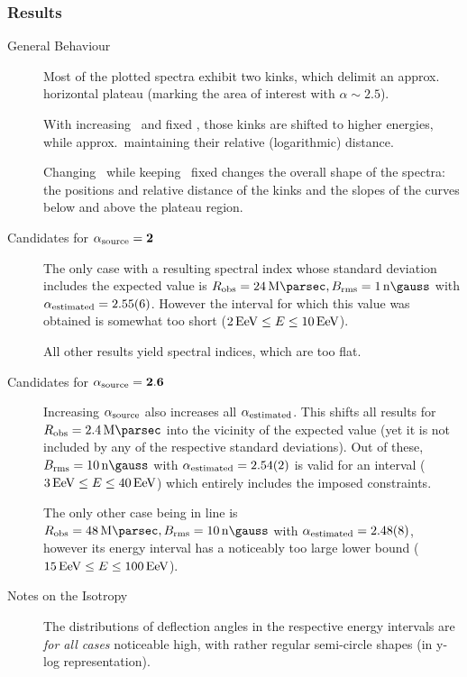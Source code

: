 \subsubsection*{Results}
\begin{description}
    \item[General Behaviour]
        Most of the plotted spectra exhibit two kinks, which delimit an
        approx.~ horizontal plateau (marking the area of interest with
        $\alpha\sim2.5$).

        With increasing \Robserver~and fixed \Brms, those kinks are shifted to
        higher energies, while approx.~maintaining their relative (logarithmic)
        distance.

        Changing \Brms~while keeping \Robserver~fixed changes the overall shape
        of the spectra: the positions and relative distance of the kinks and
        the slopes of the curves below and above the plateau region.

    \item[Candidates for $\mathbf{\alphasource=2}$]
        The only case with a resulting spectral index whose standard deviation
        includes the expected value is $\Robserver=\SI{24}{\mega\parsec},
        \Brms=\SI{1}{\nano\gauss}$ with $\alphafalling=\num{2.55(6)}$. However
        the interval for which this value was obtained is somewhat too short
        ($\inrange{E}{2}{10}{\exa\eV}$).

        All other results yield spectral indices, which are too flat.

    \item[Candidates for $\mathbf{\alphasource=2.6}$]
        Increasing ${\alphasource}$ also increases all
        ${\alphafalling}$. This shifts all results for
        $\Robserver=\SI{2.4}{\mega\parsec}$ into the vicinity of the expected
        value (yet it is not included by any of the respective standard
        deviations). Out of these, $\Brms=\SI{10}{\nano\gauss}$ with
        $\alphafalling=\num{2.54(2)}$ is valid for an interval
        ($\inrange{E}{3}{40}{\exa\eV}$) which entirely includes the imposed
        constraints.

        The only other case being in line is $\Robserver=\SI{48}{\mega\parsec},
        \Brms=\SI{10}{\nano\gauss}$ with $\alphafalling=\num{2.48(8)}$,
        however its energy interval has a noticeably too large lower bound
        ($\inrange{E}{15}{100}{\exa\eV}$).

    \item[Notes on the Isotropy]
        The distributions of deflection angles in the respective energy
        intervals are \emph{for all cases} noticeable high, with rather regular
        semi-circle shapes (in y-log representation).


\end{description}
